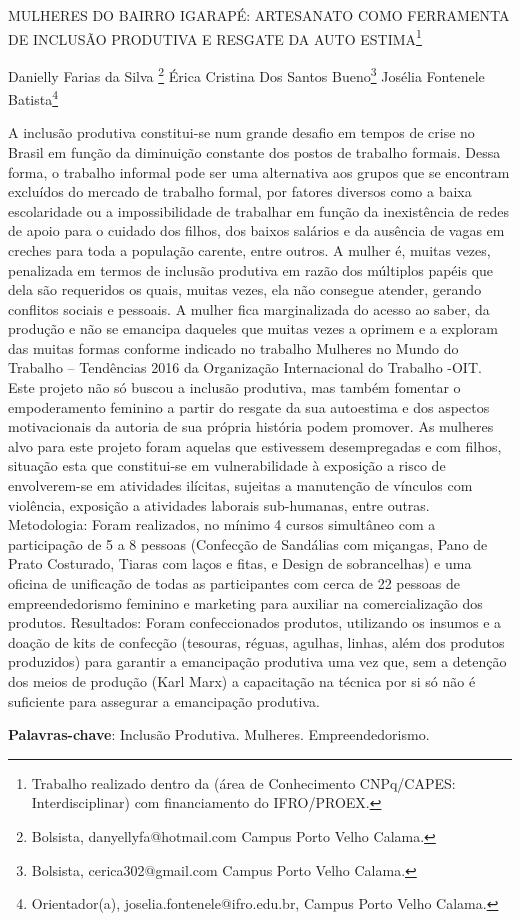 \documentclass[article,12pt,onesidea,4paper,english,brazil]{abntex2}
\begin{document}
	
	
	\frenchspacing 
	
	\begin{center}
		\LARGE MULHERES DO BAIRRO IGARAPÉ: ARTESANATO COMO FERRAMENTA DE INCLUSÃO PRODUTIVA E RESGATE DA AUTO ESTIMA\footnote{Trabalho realizado dentro da (área de Conhecimento CNPq/CAPES: Interdisciplinar) com financiamento do IFRO/PROEX.}
		
		\normalsize
		Danielly Farias da Silva \footnote{Bolsista, danyellyfa@hotmail.com Campus Porto Velho Calama.} 
		Érica Cristina Dos Santos Bueno\footnote{Bolsista, cerica302@gmail.com  Campus Porto Velho Calama.} 
	    Josélia Fontenele Batista\footnote{Orientador(a), joselia.fontenele@ifro.edu.br, Campus Porto Velho Calama.} 
	  
	\end{center}
	
	\noindent A inclusão produtiva constitui-se num grande desafio em tempos de crise no Brasil em função da diminuição constante dos postos de trabalho formais.  Dessa forma, o trabalho informal pode ser uma alternativa aos grupos que se encontram excluídos do mercado de trabalho formal, por fatores diversos como a baixa escolaridade ou a impossibilidade de trabalhar em função da inexistência de redes de apoio para o cuidado dos filhos, dos baixos salários e da ausência de vagas em creches para toda a população carente, entre outros. A mulher é, muitas vezes, penalizada em termos de inclusão produtiva em razão dos múltiplos papéis que dela são requeridos os quais, muitas vezes, ela não consegue atender, gerando conflitos sociais e pessoais. A mulher fica marginalizada do acesso ao saber, da produção e não se emancipa daqueles que muitas vezes a oprimem e a exploram das muitas formas conforme indicado no trabalho Mulheres no Mundo do Trabalho – Tendências 2016 da Organização Internacional do Trabalho -OIT. Este projeto não só buscou a inclusão produtiva, mas também fomentar o empoderamento feminino a partir do resgate da sua autoestima e dos aspectos motivacionais da autoria de sua própria história podem promover. As mulheres alvo para este projeto foram aquelas que estivessem desempregadas e com filhos, situação esta que constitui-se em vulnerabilidade à exposição a risco de envolverem-se em atividades ilícitas, sujeitas a manutenção de vínculos com violência, exposição a atividades laborais sub-humanas, entre outras. Metodologia: Foram realizados, no mínimo 4 cursos simultâneo com a participação de 5 a 8 pessoas (Confecção de Sandálias com miçangas, Pano de Prato Costurado, Tiaras com laços e fitas, e Design de sobrancelhas) e uma oficina de unificação de todas as participantes com cerca de 22 pessoas de empreendedorismo feminino e marketing para auxiliar na comercialização dos produtos.  Resultados: Foram confeccionados produtos, utilizando os insumos e a doação de kits de confecção (tesouras, réguas, agulhas, linhas, além dos produtos produzidos) para garantir a emancipação produtiva uma vez que, sem a detenção dos meios de produção (Karl Marx) a capacitação na técnica por si só não é suficiente para assegurar a emancipação produtiva.
	
	\vspace{\onelineskip}
	
	\noindent
	\textbf{Palavras-chave}: Inclusão Produtiva. Mulheres. Empreendedorismo.
	
\end{document}
